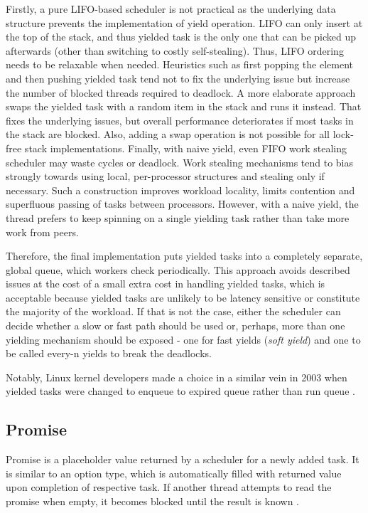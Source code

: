 \documentclass[12pt,a4paper,twoside]{report}
\begin{document}
Firstly, a pure LIFO-based scheduler is not practical as the underlying data structure prevents the implementation of yield operation. LIFO can only insert at the top of the stack, and thus yielded task is the only one that can be picked up afterwards (other than switching to costly self-stealing). Thus, LIFO ordering needs to be relaxable when needed. Heuristics such as first popping the element and then pushing yielded task tend not to fix the underlying issue but increase the number of blocked threads required to deadlock. A more elaborate approach swaps the yielded task with a random item in the stack and runs it instead. That fixes the underlying issues, but overall performance deteriorates if most tasks in the stack are blocked. Also, adding a swap operation is not possible for all lock-free stack implementations. Finally, with naive yield, even FIFO work stealing scheduler may waste cycles or deadlock. Work stealing mechanisms tend to bias strongly towards using local, per-processor structures and stealing only if necessary. Such a construction improves workload locality, limits contention and superfluous passing of tasks between processors. However, with a naive yield, the thread prefers to keep spinning on a single yielding task rather than take more work from peers.

Therefore, the final implementation puts yielded tasks into a completely separate, global queue, which workers check periodically. This approach avoids described issues at the cost of a small extra cost in handling yielded tasks, which is acceptable because yielded tasks are unlikely to be latency sensitive or constitute the majority of the workload. If that is not the case, either the scheduler can decide whether a slow or fast path should be used or, perhaps, more than one yielding mechanism should be exposed - one for fast yields (\textit{soft yield}) and one to be called every-n yields to break the deadlocks. 

Notably, Linux kernel developers made a choice in a similar vein in 2003 when yielded tasks were changed to enqueue to expired queue rather than run queue \cite{Theright8:online}. 

\subsection{Promise}
\label{section:promise}
Promise is a placeholder value returned by a scheduler for a newly added task. It is similar to an option type, which is automatically filled with returned value upon completion of respective task. If another thread attempts to read the promise when empty, it becomes blocked until the result is known \cite{Swalens2014}. 
\end{document}
